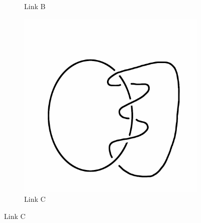 \documentclass[12pt,letterpaper]{article}
\theoremstyle{definition}
\begin{document}
\begin{figure}[h!]
\begin{subfigure}{.3\textwidth}
        \caption{Link B}
    \end{subfigure}
    \hspace{.5cm}
    \begin{subfigure}{.3\textwidth}
        \centering
        \includegraphics[width=\textwidth]{rgp11pics/lno3.png}
        \caption{Link C}
    \end{subfigure}
    

\end{figure}
\end{document}
